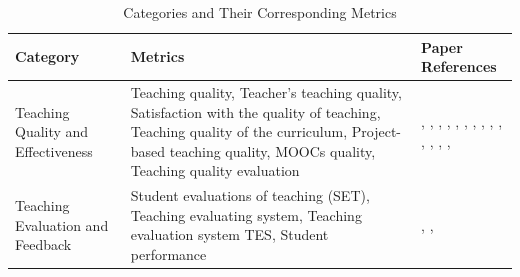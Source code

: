 \begin{table}
\centering
\caption{Categories and Their Corresponding Metrics}
\label{Categories metrics}
\begin{tabular}{|p{}|p{}|p{}|}
\hline
\textbf{Category} & \textbf{Metrics} & \textbf{Paper References} \\ \hline
Teaching Quality and Effectiveness & Teaching quality, Teacher's teaching quality, Satisfaction with the quality of teaching, Teaching quality of the curriculum, Project-based teaching quality, MOOCs quality, Teaching quality evaluation & 
\cite{Competition_Neural_Network_Model_Application_in_the_Bilingual_Teaching_Quality_Evaluation_of_Universities},
\cite{Visualizing_Student_Opinion_Through_Text_Analysis}\cite{Improving_MOOC_quality_using_learning_analytics_and_tools},
\cite{Research_on_the_Application_of_BP_Neural_Network_in_Vocal_Music_Teaching_Quality_Evaluation}, \cite{Evaluating_the_quality_of_teaching_in_higher_education_institutes_using_clustering_approach_and_set_pair_analysis}, \cite{An_Improved_BP_Neural_Network-Based_Quality_Evaluation_Model_for_Chinese_International_Education_Teaching_Courses}, \cite{Research_on_Project-Based_Teaching_Quality_Evaluation_Based_on_Fuzzy_Cluster_Analysis}, \cite{Improving_MOOC_quality_using_learning_analytics_and_tools}, \cite{Online_reviews_evaluation_system_for_higher_education_institution:_An_aspect_based_sentiment_analysis_tool}, \cite{Automatic_Rules_Generation_for_Teaching_Strategies_Improvement}, \cite{Analyzing_educational_comments_for_topics_and_sentiments:_A_text_analytics_approach}, \cite{An_Evaluation_Model_of_Moral_Education_Teaching_Quality_in_Universities_Based_on_System_Control_Theory}, \cite{Research_on_the_Application_of_BP_Neural_Network_in_the_Evaluation_of_College_Teaching_Quality}, 
\cite{The_Evaluation_and_Application_of_BP_Neural_Network_in_the_Multiple_Quality_Assurance_Paths_of_Higher_Education},
\cite{Research_on_Evaluation_of_Online_Teaching_Effect_based_on_Deep_Learning_Technology},
\cite{The_Evaluation_and_Application_of_BP_Neural_Network_in_the_Multiple_Quality_Assurance_Paths_of_Higher_Education} \\ \hline
Teaching Evaluation and Feedback & Student evaluations of teaching (SET), Teaching evaluating system, Teaching evaluation system TES, Student performance & 
\cite{Palaute:_An_Online_Text_Mining_Tool_for_Analyzing_Written_Student_Course_Feedback}
, \cite{Romanov}
\cite{Evaluation_System_of_Tourism_Psychology_Teaching_Quality_Based_on_Convolutional_Neural_Network},
\cite{Personalized_Learning_Model_based_on_Deep_Learning_Algorithm_for_Student_Behaviour_Analytic} \\ \hline

\end{tabular}
\end{table}

